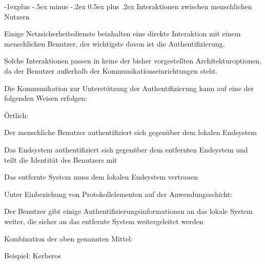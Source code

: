 \documentclass[a4paper]{article}
\makeatletter
\renewcommand{\subsection}{\@startsection{subsection}{2}{0mm}%
 {-1explus -.5ex minus -.2ex}%
 {0.5ex plus .2ex}%
 {\normalfont\normalsize\bfseries}}
\makeatother
\begin{document}
\begin{multicols}{3}
      \subsection{Interaktionen zwischen menschlichen Nutzern}
      \begin{itemize*}
            \item Einige Netzsicherheitsdienste beinhalten eine direkte Interaktion mit einem menschlichen Benutzer, der wichtigste davon ist die Authentifizierung.
            \item Solche Interaktionen passen in keine der bisher vorgestellten Architekturoptionen, da der Benutzer außerhalb der Kommunikationseinrichtungen steht.
            \item Die Kommunikation zur Unterstützung der Authentifizierung kann auf eine der folgenden Weisen erfolgen:
            \begin{itemize*}
                  \item Örtlich:
                  \begin{itemize*}
                        \item Der menschliche Benutzer authentifiziert sich gegenüber dem lokalen Endsystem
                        \item Das Endsystem authentifiziert sich gegenüber dem entfernten Endsystem und teilt die Identität des Benutzers mit
                        \item Das entfernte System muss dem lokalen Endsystem vertrauen
                  \end{itemize*}
                  \item Unter Einbeziehung von Protokollelementen auf der Anwendungsschicht:
                  \begin{itemize*}
                        \item Der Benutzer gibt einige Authentifizierungsinformationen an das lokale System weiter, die sicher an das entfernte System weitergeleitet werden
                  \end{itemize*}
                  \item Kombination der oben genannten Mittel:
                  \begin{itemize*}
                        \item Beispiel: Kerberos
                  \end{itemize*}
            \end{itemize*}
      \end{itemize*}


\end{multicols}
\end{document}
